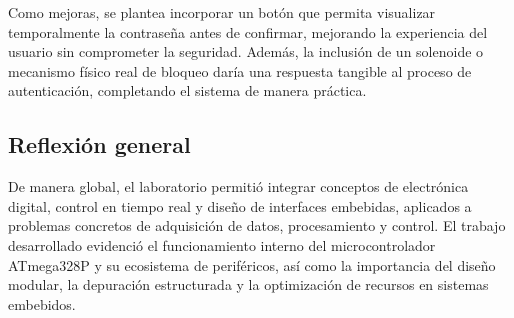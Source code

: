 \vspace{1em}

Como mejoras, se plantea incorporar un botón que permita visualizar temporalmente la contraseña antes de confirmar, mejorando la experiencia del usuario sin comprometer la seguridad. Además, la inclusión de un solenoide o mecanismo físico real de bloqueo daría una respuesta tangible al proceso de autenticación, completando el sistema de manera práctica.

\subsection{Reflexión general}

De manera global, el laboratorio permitió integrar conceptos de electrónica digital, control en tiempo real y diseño de interfaces embebidas, aplicados a problemas concretos de adquisición de datos, procesamiento y control. El trabajo desarrollado evidenció el funcionamiento interno del microcontrolador ATmega328P y su ecosistema de periféricos, así como la importancia del diseño modular, la depuración estructurada y la optimización de recursos en sistemas embebidos.